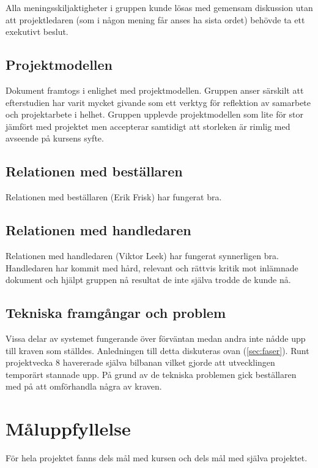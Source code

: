 \documentclass[10pt,oneside,swedish]{lips}
\begin{document}
Alla meningsskiljaktigheter i gruppen kunde lösas med gemensam diskussion utan
att projektledaren (som i någon mening får anses ha sista ordet) behövde ta ett
exekutivt beslut.

\subsection{Projektmodellen}

Dokument framtogs i enlighet med projektmodellen. Gruppen anser särskilt att
efterstudien har varit mycket givande som ett verktyg för reflektion av
samarbete och projektarbete i helhet. Gruppen upplevde projektmodellen som lite
för stor jämfört med projektet men accepterar samtidigt att storleken är rimlig
med avseende på kursens syfte.

\subsection{Relationen med beställaren}

Relationen med beställaren (Erik Frisk) har fungerat bra.

\subsection{Relationen med handledaren}

Relationen med handledaren (Viktor Leek) har fungerat synnerligen bra.
Handledaren har kommit med hård, relevant och rättvis kritik mot inlämnade
dokument och hjälpt gruppen nå resultat de inte själva trodde de kunde nå.

\subsection{Tekniska framgångar och problem}

Vissa delar av systemet fungerande över förväntan medan andra inte nådde upp
till kraven som ställdes. Anledningen till detta diskuteras ovan
(\ref{sec:faser}). Runt projektvecka 8 havererade själva bilbanan vilket gjorde
att utvecklingen temporärt stannade upp. På grund av de tekniska problemen gick
beställaren med på att omförhandla några av kraven.

\section{Måluppfyllelse}

För hela projektet fanns dels mål med kursen och dels mål med själva projektet.
\end{document}
